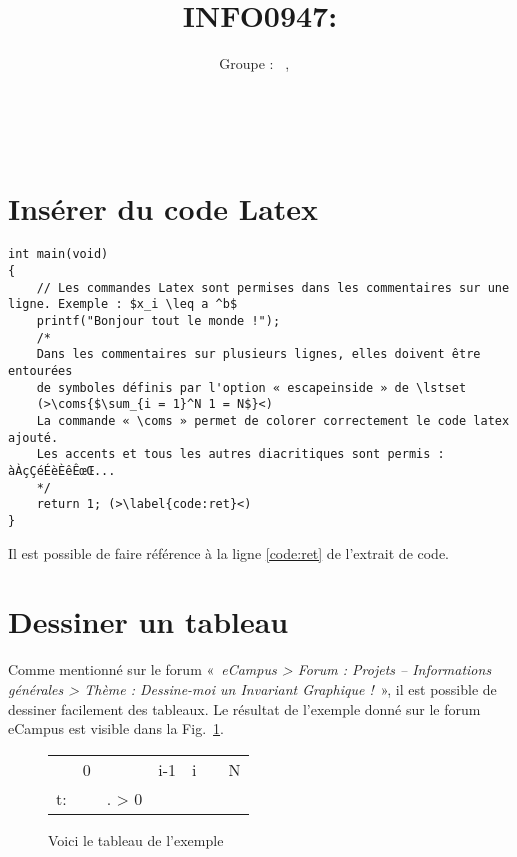 \documentclass[a4paper, 11pt, oneside]{article}
\title{INFO0947: \intitule}
\author{Groupe \GrNbr : \PrenomUN~\textsc{\NomUN}, \PrenomDEUX~\textsc{\NomDEUX}}
\date{}
\newcommand{\coms}[1]{\textcolor{MidnightBlue}{#1}}
\newcommand{\tablemat}{~}
\begin{document}
\maketitle
\newpage
\tablemat
\newpage


\section{Insérer du code Latex}

\begin{lstlisting}[caption={Un programme tout simple}]
int main(void)
{
	// Les commandes Latex sont permises dans les commentaires sur une ligne. Exemple : $x_i \leq a ^b$
	printf("Bonjour tout le monde !");
	/*
	Dans les commentaires sur plusieurs lignes, elles doivent être entourées
	de symboles définis par l'option « escapeinside » de \lstset
	(>\coms{$\sum_{i = 1}^N 1 = N$}<)
	La commande « \coms » permet de colorer correctement le code latex ajouté.
	Les accents et tous les autres diacritiques sont permis : àÀçÇéÉèÈêÊœŒ...
	*/
	return 1; (>\label{code:ret}<)
}
\end{lstlisting}

Il est possible de faire référence à la ligne \ref{code:ret} de l'extrait de code.

\section{Dessiner un tableau}

Comme mentionné sur le forum «~\emph{eCampus > Forum : Projets -- Informations générales > Thème : Dessine-moi un Invariant Graphique !}~», il est possible de dessiner facilement des tableaux. Le résultat de l'exemple donné sur le forum eCampus est visible dans la Fig.~\ref{fig:exemple}.

\begin{figure}[!h]
\centering
\begin{tabular}{l|llr|ll|l}
 & 0 &  & \multicolumn{1}{r|}{i-1} & i &  & N \\ \cline{2-6}
t: & \cellcolor[HTML]{FFCC67} & \cellcolor[HTML]{FFCC67}. > 0 & \cellcolor[HTML]{FFCC67} &  &  &  \\ \cline{2-6}
\end{tabular}
\caption{Voici le tableau de l'exemple}
\label{fig:exemple}
\end{figure}
\end{document}
